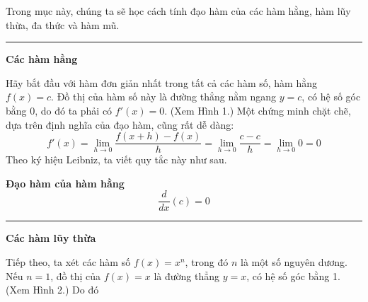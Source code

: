 \begin{minipage}[t]{0.71\textwidth}
  Trong mục này, chúng ta sẽ học cách tính đạo hàm của các hàm hằng, hàm lũy thừa, đa thức và hàm mũ.
  \vspace{1.1em}

  \noindent
  \textcolor{stewartcyan}{\rule{1.1ex}{1.1ex}}\hspace{0.5em}\textbf{\textsf{\large Các hàm hằng}}
  \vspace{0.6em}

  Hãy bắt đầu với hàm đơn giản nhất trong tất cả các hàm số, hàm hằng $f(x) = c$. Đồ thị của hàm số này là đường thẳng nằm ngang $y = c$, có hệ số góc bằng 0, do đó ta phải có $f'(x) = 0$. (Xem Hình 1.) Một chứng minh chặt chẽ, dựa trên định nghĩa của đạo hàm, cũng rất dễ dàng:
  \[
    f'(x) = \lim_{h \to 0} \frac{f(x + h) - f(x)}{h} = \lim_{h \to 0} \frac{c - c}{h} = \lim_{h \to 0} 0 = 0
  \]
  Theo ký hiệu Leibniz, ta viết quy tắc này như sau.
  \vspace{0.6em}

  \begin{tcolorbox}[
    enhanced,
    colback=white,
    colframe=stewartred,
    boxrule=0.8pt,
    arc=0pt,
    width=\linewidth,
    left=10pt, right=10pt, top=6pt, bottom=4pt
  ]
    {\bfseries\sffamily\color{stewartred}\small Đạo hàm của hàm hằng}
    \vspace{-3pt}
    \[
      \frac{d}{dx}(c) = 0
    \]
  \end{tcolorbox}
  \vspace{0.9em}

  \noindent
  \textcolor{stewartcyan}{\rule{1.1ex}{1.1ex}}\hspace{0.5em}\textbf{\textsf{\large Các hàm lũy thừa}}
  \vspace{0.6em}

  Tiếp theo, ta xét các hàm số $f(x) = x^n$, trong đó $n$ là một số nguyên dương. Nếu $n = 1$, đồ thị của $f(x) = x$ là đường thẳng $y = x$, có hệ số góc bằng 1. (Xem Hình 2.) Do đó
  \vspace{0.6em}

  \noindent
  \vspace{0.8em}


\end{minipage}

